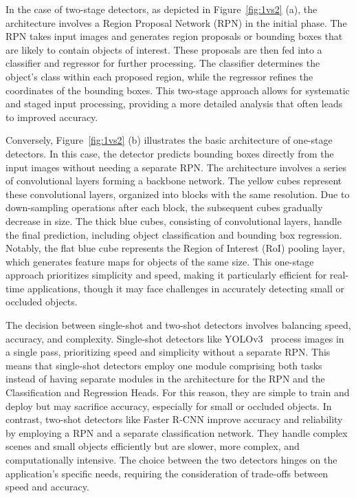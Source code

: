 In the case of two-stage detectors, as depicted in Figure~\ref{fig:1vs2} (a), the architecture involves a Region Proposal Network (RPN) in the initial phase.
The RPN takes input images and generates region proposals or bounding boxes that are likely to contain objects of interest.
These proposals are then fed into a classifier and regressor for further processing.
The classifier determines the object's class within each proposed region, while the regressor refines the coordinates of the bounding boxes.
This two-stage approach allows for systematic and staged input processing, providing a more detailed analysis that often leads to improved accuracy.

Conversely, Figure~\ref{fig:1vs2} (b) illustrates the basic architecture of one-stage detectors.
In this case, the detector predicts bounding boxes directly from the input images without needing a separate RPN\@.
The architecture involves a series of convolutional layers forming a backbone network.
The yellow cubes represent these convolutional layers, organized into blocks with the same resolution.
Due to down-sampling operations after each block, the subsequent cubes gradually decrease in size.
The thick blue cubes, consisting of convolutional layers, handle the final prediction, including object classification and bounding box regression.
Notably, the flat blue cube represents the Region of Interest (RoI) pooling layer, which generates feature maps for objects of the same size.
This one-stage approach prioritizes simplicity and speed, making it particularly efficient for real-time applications, though it may face challenges in accurately detecting small or occluded objects.


The decision between single-shot and two-shot detectors involves balancing speed, accuracy, and complexity.
Single-shot detectors like YOLOv3~\cite{YOLOv3} process images in a single pass, prioritizing speed and simplicity without a separate RPN. This means that single-shot detectors employ one module comprising both tasks instead of having separate modules in the architecture for the RPN and the Classification and Regression Heads.
For this reason, they are simple to train and deploy but may sacrifice accuracy, especially for small or occluded objects.
In contrast, two-shot detectors like Faster R-CNN improve accuracy and reliability by employing a RPN and a separate classification network.
They handle complex scenes and small objects efficiently but are slower, more complex, and computationally intensive.
The choice between the two detectors hinges on the application's specific needs, requiring the consideration of trade-offs between speed and accuracy.


